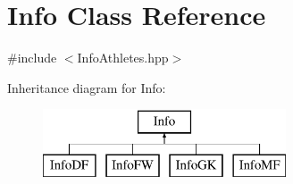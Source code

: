 \hypertarget{class_info}{}\section{Info Class Reference}
\label{class_info}


{\ttfamily \#include $<$Info\+Athletes.\+hpp$>$}

Inheritance diagram for Info\+:\begin{figure}[H]
\begin{center}
\leavevmode
\includegraphics[height=2.000000cm]{class_info}
\end{center}
\end{figure}
